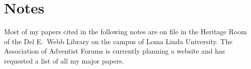 \chapter{Notes}
\label{ch:notes}

Most of my papers cited in the following notes are on file in the Heritage
Room of the Del E.\ Webb Library on the campus of Loma Linda University. The
Association of Adventist Forums is currently planning a website and has
requested a list of all my major papers.
